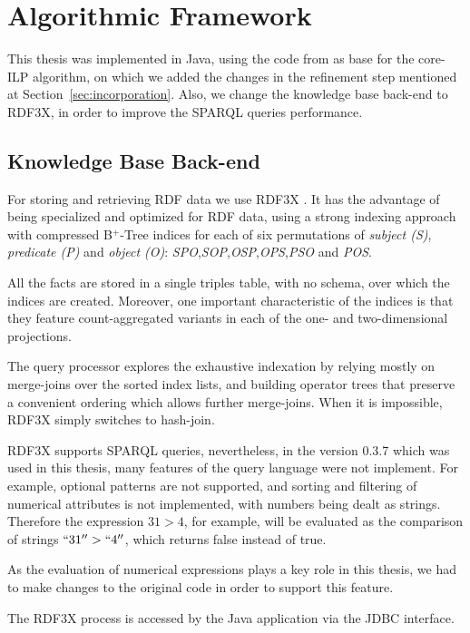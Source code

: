\chapter{Algorithmic Framework}
\label{af:intro}

This thesis was implemented in Java, using the code from \citet{Teflioudi2011} as base for the core-ILP
algorithm, on which we added the changes in the refinement step mentioned at Section~\ref{sec:incorporation}. Also, we
change the knowledge base back-end to RDF3X, in order to improve the SPARQL queries performance.

\section{Knowledge Base Back-end}

For storing and retrieving RDF data we use RDF3X \citep{Neumann:2010:RES:1731351.1731354}. It has the advantage of being
specialized and optimized for RDF data, using a strong indexing approach with compressed B$^+$-Tree indices for each of
six permutations of \emph{subject (S)}, \emph{predicate (P)} and \emph{object (O)}:
\emph{SPO},\emph{SOP},\emph{OSP},\emph{OPS},\emph{PSO} and \emph{POS}.

All the facts are stored in a single triples table, with no schema, over which the indices are created. Moreover, one
important characteristic of the indices is that they feature count-aggregated variants in each of the one- and
two-dimensional projections.

The query processor explores the exhaustive indexation by relying mostly on merge-joins over the sorted index lists, and
building operator trees that preserve a convenient ordering which allows further merge-joins. When it is impossible,
RDF3X simply switches to hash-join.

RDF3X supports SPARQL queries, nevertheless, in the version 0.3.7 which was used in this thesis, many features of the
query language were not implement. For example, optional patterns are not supported, and sorting and filtering of
numerical attributes is not implemented, with numbers being dealt as strings. Therefore the expression $31>4$, for
example, will be evaluated as the comparison of strings $``31''>``4''$, which returns false instead of true.

As the evaluation of numerical expressions plays a key role in this thesis, we had to make changes to the original code
in order to support this feature.

The RDF3X process is accessed by the Java application via the JDBC interface.

